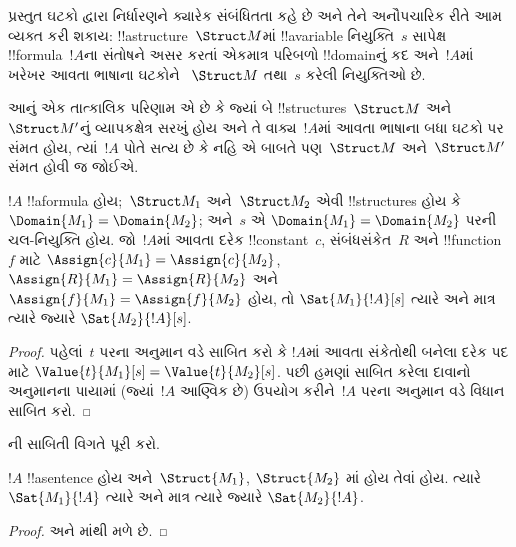 \documentclass[../../../include/open-logic-section]{subfiles}
\begin{document}


\begin{explain}
પ્રસ્તુત ઘટકો દ્વારા નિર્ધારણને ક્યારેક સંબંધિતતા કહે છે અને તેને
અનૌપચારિક રીતે આમ વ્યક્ત કરી શકાય: !!a{structure}~$\Struct M$માં
!!a{variable} નિયુક્તિ~$s$ સાપેક્ષ !!{formula}~$!A$ના સંતોષને અસર કરતાં
એકમાત્ર પરિબળો !!{domain}નું કદ અને~$!A$માં ખરેખર આવતા ભાષાના ઘટકોને
~$\Struct M$ તથા~$s$ કરેલી નિયુક્તિઓ છે.

આનું એક તાત્કાલિક પરિણામ એ છે કે જ્યાં બે !!{structure}s~$\Struct M$
અને~$\Struct M'$નું વ્યાપકક્ષેત્ર સરખું હોય અને તે વાક્ય~$!A$માં આવતા
ભાષાના બધા ઘટકો પર સંમત હોય, ત્યાં~$!A$ પોતે સત્ય છે કે નહિ એ બાબતે
પણ~$\Struct M$ અને~$\Struct M'$ સંમત હોવી જ જોઈએ.
\end{explain}

\begin{prop}[પ્રસ્તુત ઘટકો દ્વારા નિર્ધારણ]
  $!A$ !!a{formula} હોય;~$\Struct M_1$ અને~$\Struct M_2$ એવી
  !!{structure}s હોય કે $\Domain{M_1}=\Domain{M_2}$; અને~$s$ એ
  $\Domain{M_1}=\Domain{M_2}$ પરની ચલ-નિયુક્તિ હોય. જો~$!A$માં આવતા
  દરેક !!{constant}~$c$, સંબંધસંકેત~$R$ અને !!{function}~$f$ માટે
  $\Assign{c}{M_1}=\Assign{c}{M_2}$,
  $\Assign{R}{M_1}=\Assign{R}{M_2}$ અને
  $\Assign{f}{M_1}=\Assign{f}{M_2}$ હોય, તો
  $\Sat{M_1}{!A}[s]$ ત્યારે અને માત્ર ત્યારે જ્યારે
  $\Sat{M_2}{!A}[s]$.
\end{prop}

\begin{proof}
  પહેલાં~$t$ પરના અનુમાન વડે સાબિત કરો કે $!A$માં આવતા સંકેતોથી બનેલા દરેક પદ માટે
  $\Value{t}{M_1}[s]=\Value{t}{M_2}[s]$. પછી હમણાં સાબિત કરેલા દાવાનો
  અનુમાનના પાયામાં (જ્યાં~$!A$ આણ્વિક છે) ઉપયોગ કરીને~$!A$ પરના
  અનુમાન વડે વિધાન સાબિત કરો.
\end{proof}

\begin{prob}
ની સાબિતી વિગતે પૂરી કરો.
\end{prob}

\begin{cor}
  $!A$ !!a{sentence} હોય અને~$\Struct{M_1}$, $\Struct{M_2}$
  માં હોય તેવાં હોય. ત્યારે
  $\Sat{M_1}{!A}$ ત્યારે અને માત્ર ત્યારે જ્યારે $\Sat{M_2}{!A}$.
\end{cor}

\begin{proof}
 અને માંથી મળે છે.
\end{proof}
\end{document}

